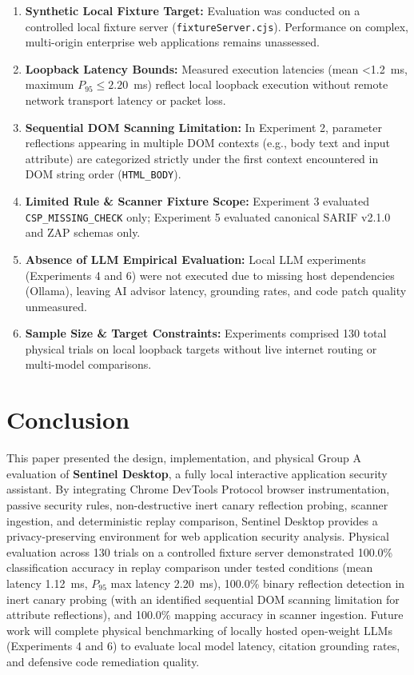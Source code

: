 \documentclass[conference]{IEEEtran}
\begin{document}
\begin{enumerate}
    \item \textbf{Synthetic Local Fixture Target:} Evaluation was conducted on a controlled local fixture server (\texttt{fixtureServer.cjs}). Performance on complex, multi-origin enterprise web applications remains unassessed.
    \item \textbf{Loopback Latency Bounds:} Measured execution latencies (mean <1.2~ms, maximum $P_{95} \le 2.20$~ms) reflect local loopback execution without remote network transport latency or packet loss.
    \item \textbf{Sequential DOM Scanning Limitation:} In Experiment 2, parameter reflections appearing in multiple DOM contexts (e.g., body text and input attribute) are categorized strictly under the first context encountered in DOM string order (\texttt{HTML\_BODY}).
    \item \textbf{Limited Rule \& Scanner Fixture Scope:} Experiment 3 evaluated \texttt{CSP\_MISSING\_CHECK} only; Experiment 5 evaluated canonical SARIF v2.1.0 and ZAP schemas only.
    \item \textbf{Absence of LLM Empirical Evaluation:} Local LLM experiments (Experiments 4 and 6) were not executed due to missing host dependencies (Ollama), leaving AI advisor latency, grounding rates, and code patch quality unmeasured.
    \item \textbf{Sample Size \& Target Constraints:} Experiments comprised 130 total physical trials on local loopback targets without live internet routing or multi-model comparisons.
\end{enumerate}

\section{Conclusion}

This paper presented the design, implementation, and physical Group A evaluation of \textbf{Sentinel Desktop}, a fully local interactive application security assistant. By integrating Chrome DevTools Protocol browser instrumentation, passive security rules, non-destructive inert canary reflection probing, scanner ingestion, and deterministic replay comparison, Sentinel Desktop provides a privacy-preserving environment for web application security analysis. Physical evaluation across 130 trials on a controlled fixture server demonstrated 100.0\% classification accuracy in replay comparison under tested conditions (mean latency 1.12~ms, $P_{95}$ max latency 2.20~ms), 100.0\% binary reflection detection in inert canary probing (with an identified sequential DOM scanning limitation for attribute reflections), and 100.0\% mapping accuracy in scanner ingestion. Future work will complete physical benchmarking of locally hosted open-weight LLMs (Experiments 4 and 6) to evaluate local model latency, citation grounding rates, and defensive code remediation quality.



\end{document}
